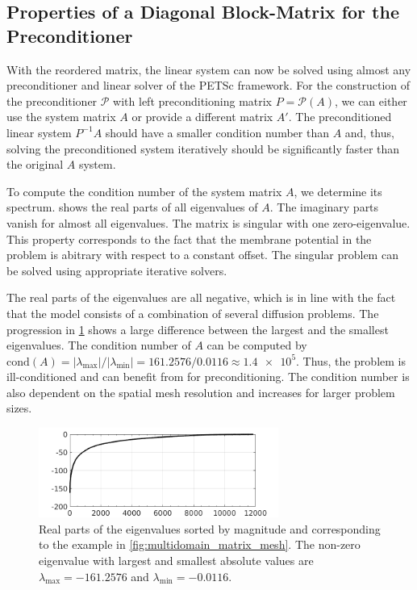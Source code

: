 \subsection{Properties of a Diagonal Block-Matrix for the Preconditioner}\label{sec:multidomain_diagonal_matrix}
With the reordered matrix, the linear system can now be solved using almost any preconditioner and linear solver of the PETSc framework. 
For the construction of the preconditioner $\mathcal{P}$ with left preconditioning matrix $P=\mathcal{P}(A)$, we can either use the system matrix $A$ or provide a different matrix $A'$. The preconditioned linear system $P^{-1}A$ should have a smaller condition number than $A$ and, thus, solving the preconditioned system iteratively should be significantly faster than the original $A$ system.

To compute the condition number of the system matrix $A$, we determine its spectrum.  shows the real parts of all eigenvalues of $A$. The imaginary parts vanish for almost all eigenvalues. The matrix is singular with one zero-eigenvalue. This property corresponds to the fact that the membrane potential in the problem is abitrary with respect to a constant offset. The singular problem can be solved using appropriate iterative solvers.

The real parts of the eigenvalues are all negative, which is in line with the fact that the model consists of a combination of several diffusion problems. The progression in \cref{fig:eigenvalues} shows a large difference between the largest and the smallest eigenvalues. The condition number of $A$ can be computed by $\textrm{cond}(A) = |\lambda_\text{max}| / |\lambda_\text{min}| = 161.2576 / 0.0116 \approx \num{1.4e5}$. Thus, the problem is ill-conditioned and can benefit from for preconditioning. The condition number is also dependent on the spatial mesh resolution and increases for larger problem sizes.

\begin{figure}
  \centering%
  \includegraphics[width=0.7\textwidth]{images/implementation/eigenvalues.png}%
  \caption{Real parts of the eigenvalues sorted by magnitude and corresponding to the example in \cref{fig:multidomain_matrix_mesh}. The non-zero eigenvalue with largest and smallest absolute values are $\lambda_\text{max} = \num{-161.2576}$ and $\lambda_\text{min} = \num{-0.0116}$.}%
  \label{fig:eigenvalues}%
\end{figure}%


